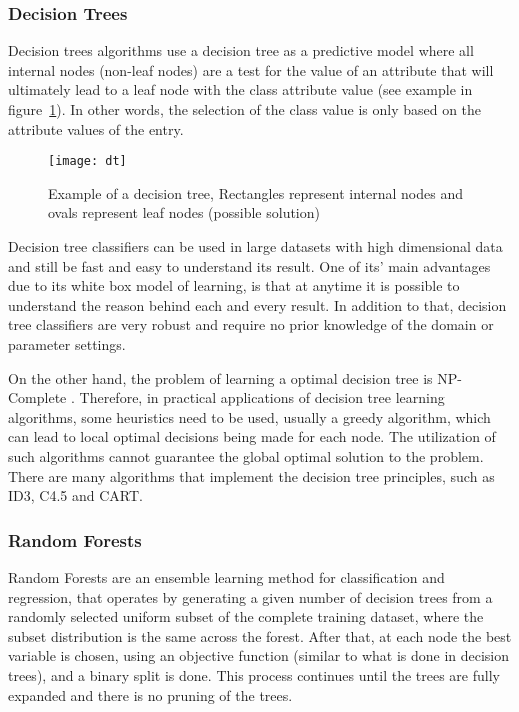 \subsubsection{Decision Trees}

Decision trees algorithms use a decision tree as a predictive model where all internal nodes (non-leaf nodes) are a test for the value of an attribute that will
ultimately lead to a leaf node with the class attribute value (see example in figure~\ref{fig:dtree}).
In other words, the selection of the class value is only based on the attribute values of the entry.\cite{HanKam06}

\begin{figure}[h]
  \begin{center}
    \leavevmode
    \texttt{[image: dt]}
    \caption{Example of a decision tree, Rectangles represent internal nodes and ovals represent leaf nodes (possible solution)\cite{KER:70953}}
    \label{fig:dtree}
  \end{center}
\end{figure}

Decision tree classifiers can be used in large datasets with high dimensional data and still be fast and easy to understand its result.
One of its' main advantages due to its white box model of learning, is that at anytime it is possible to understand the reason behind each and every result.
In addition to that, decision tree classifiers are very robust and require no prior knowledge of the domain or parameter settings.

On the other hand, the problem of learning a optimal decision tree is NP-Complete \cite{Hyafil197615}.
Therefore, in practical applications of decision tree learning algorithms, some heuristics need to be used,
usually a greedy algorithm, which can lead
to local optimal decisions being made for each node. The utilization of such algorithms cannot guarantee the global optimal solution to the problem.
There are many algorithms that implement the decision tree principles, such as ID3, C4.5 and CART.

\subsubsection{Random Forests}

Random Forests \cite{raey} are an ensemble learning method for classification and regression, that operates by generating a given number of 
decision trees from a randomly selected uniform subset of the complete training dataset, where the subset distribution is the same across the forest.
After that, at each node the best variable is chosen, using an objective function (similar to what is done in decision trees), and a binary split is done.
This process continues until the trees are fully expanded and there is no pruning of the trees.

